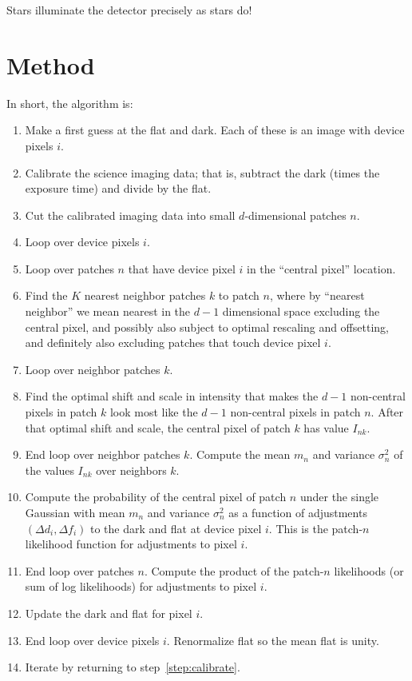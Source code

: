 \documentclass[12pt,preprint,pdftex]{aastex}
\begin{document}
Stars illuminate the detector precisely as stars do!

\section{Method}

In short, the algorithm is:
\begin{enumerate}
\item Make a first guess at the flat and dark.  Each of these is an image with device pixels $i$.
\item Calibrate the science imaging data; that is, subtract the dark (times the exposure time) and divide by the flat.\label{step:calibrate}
\item Cut the calibrated imaging data into small $d$-dimensional patches $n$.
\item Loop over device pixels $i$.
\item Loop over patches $n$ that have device pixel $i$ in the ``central pixel'' location.
\item Find the $K$ nearest neighbor patches $k$ to patch $n$, where by ``nearest neighbor'' we mean nearest in the $d-1$ dimensional space excluding the central pixel, and possibly also subject to optimal rescaling and offsetting, and definitely also excluding patches that touch device pixel $i$.
\item Loop over neighbor patches $k$.
\item Find the optimal shift and scale in intensity that makes the $d-1$ non-central pixels in patch $k$ look most like the $d-1$ non-central pixels in patch $n$.  After that optimal shift and scale, the central pixel of patch $k$ has value $I_{nk}$.
\item End loop over neighbor patches $k$.  Compute the mean $m_n$ and variance $\sigma^2_n$ of the values $I_{nk}$ over neighbors $k$.
\item Compute the probability of the central pixel of patch $n$ under the single Gaussian with mean $m_n$ and variance $\sigma^2_n$ as a function of adjustments $(\Delta d_i, \Delta f_i)$ to the dark and flat at device pixel $i$.  This is the patch-$n$ likelihood function for adjustments to pixel $i$.
\item End loop over patches $n$.  Compute the product of the patch-$n$ likelihoods (or sum of log likelihoods) for adjustments to pixel $i$.
\item Update the dark and flat for pixel $i$.
\item End loop over device pixels $i$.  Renormalize flat so the mean flat is unity.
\item Iterate by returning to step~\ref{step:calibrate}.
\end{enumerate}
\end{document}
